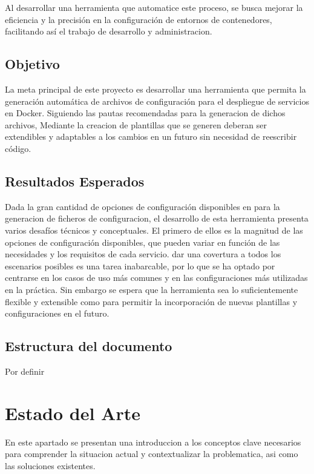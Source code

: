 \documentclass[12pt, a4paper, twoside]{article}
\begin{document}
Al desarrollar una herramienta que automatice este proceso, 
se busca mejorar la eficiencia y la precisión en la configuración de entornos de contenedores, facilitando así el trabajo de desarrollo y administracion. 

\subsection{Objetivo}
La meta principal de este proyecto es desarrollar una herramienta que permita la generación automática de archivos de configuración para el despliegue de servicios en Docker.
Siguiendo las pautas recomendadas para la generacion de dichos archivos, Mediante la creacion de plantillas que se generen deberan ser extendibles y adaptables a los cambios en un futuro sin necesidad de reescribir código.
 

\subsection{Resultados Esperados}
Dada la gran cantidad de opciones de configuración disponibles en para la generacion de ficheros de configuracion, el desarrollo de esta herramienta presenta varios desafíos técnicos y conceptuales.
El primero de ellos es la magnitud de las opciones de configuración disponibles, que pueden variar en función de las necesidades y los requisitos de cada servicio.
dar una covertura a todos los escenarios posibles es una tarea inabarcable, por lo que se ha optado por centrarse en los casos de uso más comunes y en las configuraciones más utilizadas en la práctica.
Sin embargo se espera que la herramienta sea lo suficientemente flexible y extensible como para permitir la incorporación de nuevas plantillas y configuraciones en el futuro.


\subsection{Estructura del documento}
Por definir
















\section{Estado del Arte}
En este apartado se presentan una introduccion a los conceptos clave necesarios para comprender la situacion actual y contextualizar la problematica, asi como las soluciones existentes.
\end{document}
